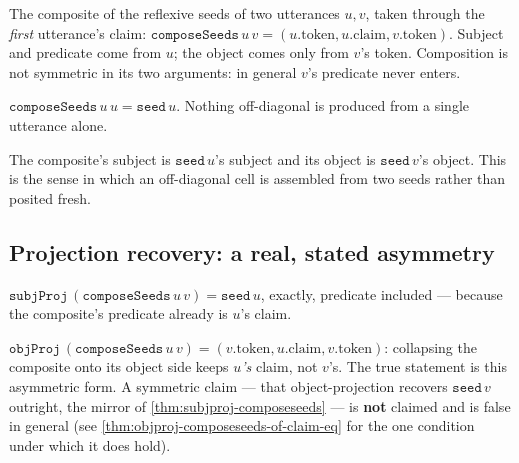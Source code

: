 \begin{proposition}\label{thm:composeseeds}\leanok{}
The composite of the reflexive seeds of two utterances \(u, v\), taken
through the \emph{first} utterance's claim: \(\texttt{composeSeeds}\,u\,v =
(u.\mathrm{token}, u.\mathrm{claim}, v.\mathrm{token})\). Subject and
predicate come from \(u\); the object comes only from \(v\)'s token.
Composition is not symmetric in its two arguments: in general \(v\)'s
predicate never enters.
\end{proposition}

\begin{proposition}\label{thm:composeseeds-self}\leanok{}
\(\texttt{composeSeeds}\,u\,u = \texttt{seed}\,u\). Nothing off-diagonal is
produced from a single utterance alone.
\end{proposition}

\begin{proposition}\label{thm:composeseeds-subj-obj}\leanok{}
The composite's subject is \(\texttt{seed}\,u\)'s subject and its object is
\(\texttt{seed}\,v\)'s object. This is the sense in which an off-diagonal
cell is assembled from two seeds rather than posited fresh.
\end{proposition}

\subsection*{Projection recovery: a real, stated asymmetry}

\begin{theorem}\label{thm:subjproj-composeseeds}\leanok{}
\(\texttt{subjProj}\,(\texttt{composeSeeds}\,u\,v) = \texttt{seed}\,u\),
exactly, predicate included --- because the composite's predicate already is
\(u\)'s claim.
\end{theorem}

\begin{theorem}\label{thm:objproj-composeseeds}\leanok{}
\(\texttt{objProj}\,(\texttt{composeSeeds}\,u\,v) = (v.\mathrm{token},
u.\mathrm{claim}, v.\mathrm{token})\): collapsing the composite onto its
object side keeps \emph{\(u\)'s} claim, not \(v\)'s. The true statement is
this asymmetric form. A symmetric claim --- that object-projection recovers
\(\texttt{seed}\,v\) outright, the mirror of
\cref{thm:subjproj-composeseeds} --- is \textbf{not} claimed and is false in
general (see \cref{thm:objproj-composeseeds-of-claim-eq} for the one
condition under which it does hold).
\end{theorem}

